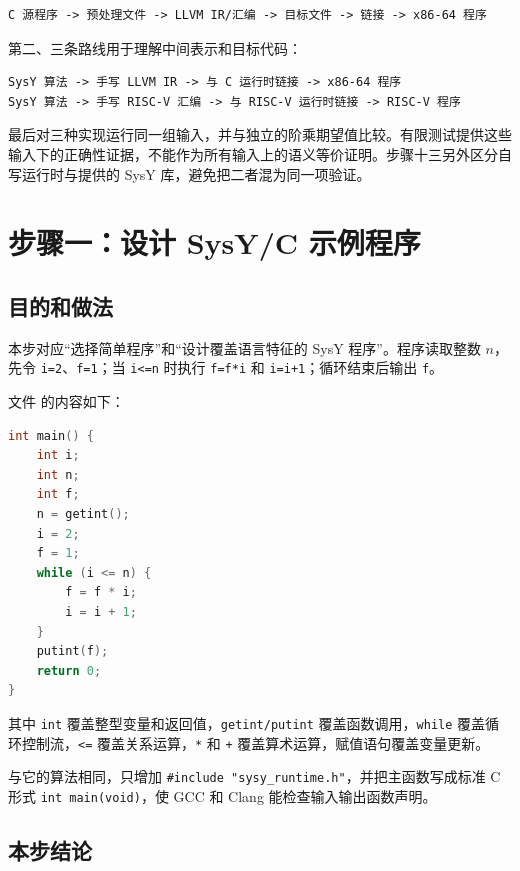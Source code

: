 \documentclass[UTF8,a4paper,12pt]{ctexart}
\begin{document}
\begin{lstlisting}
C 源程序 -> 预处理文件 -> LLVM IR/汇编 -> 目标文件 -> 链接 -> x86-64 程序
\end{lstlisting}

第二、三条路线用于理解中间表示和目标代码：

\begin{lstlisting}
SysY 算法 -> 手写 LLVM IR -> 与 C 运行时链接 -> x86-64 程序
SysY 算法 -> 手写 RISC-V 汇编 -> 与 RISC-V 运行时链接 -> RISC-V 程序
\end{lstlisting}

最后对三种实现运行同一组输入，并与独立的阶乘期望值比较。有限测试提供这些输入下的正确性证据，不能作为所有输入上的语义等价证明。步骤十三另外区分自写运行时与提供的 SysY 库，避免把二者混为同一项验证。

\section{步骤一：设计 SysY/C 示例程序}

\subsection{目的和做法}

本步对应“选择简单程序”和“设计覆盖语言特征的 SysY 程序”。程序读取整数 $n$，先令 \texttt{i=2}、\texttt{f=1}；当 \texttt{i<=n} 时执行 \texttt{f=f*i} 和 \texttt{i=i+1}；循环结束后输出 \texttt{f}。

文件  的内容如下：

\begin{lstlisting}[language=C]
int main() {
    int i;
    int n;
    int f;
    n = getint();
    i = 2;
    f = 1;
    while (i <= n) {
        f = f * i;
        i = i + 1;
    }
    putint(f);
    return 0;
}
\end{lstlisting}

其中 \texttt{int} 覆盖整型变量和返回值，\texttt{getint/putint} 覆盖函数调用，\texttt{while} 覆盖循环控制流，\texttt{<=} 覆盖关系运算，\texttt{*} 和 \texttt{+} 覆盖算术运算，赋值语句覆盖变量更新。

 与它的算法相同，只增加 \texttt{\#include "sysy\_runtime.h"}，并把主函数写成标准 C 形式 \texttt{int main(void)}，使 GCC 和 Clang 能检查输入输出函数声明。

\subsection{本步结论}
\end{document}
